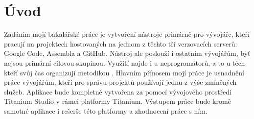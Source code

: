 \chapter{Úvod}

Zadáním mojí bakalářské práce je vytvoření nástroje primárně pro vývojáře, kteří pracují na projektech hostovaných na jednom z těchto tří verzovacích serverů: Google Code\cite{gcode}, Assembla\cite{assembla} a GitHub\cite{github}. Nástroj ale poslouží i ostatním vývojářům, byť nejsou primární cílovou skupinou. Využití najde i u neprogramátorů, a to u těch kteří svůj čas organizují metodikou . Hlavním přínosem mojí práce je usnadnění práce vývojářům, kteří pro správu projektů používají jednu z výše zmíněných služeb. Aplikace bude kompletně vytvořena za pomocí vývojového prostředí Titanium Studio v rámci platformy Titanium. Výstupem práce bude kromě samotné aplikace i rešerše této platformy a zhodnocení práce s ním.